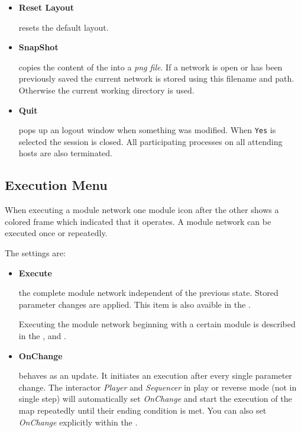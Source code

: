 \begin{itemize}
	 \item {\bf Reset Layout} 

	 resets the default layout.

	 \item {\bf SnapShot} 

	 copies the content of the {\mycanvas} into a {\it png file}. If a network is open or has been previously saved 
    the current network is stored using this filename and path. Otherwise the current working directory is used.
	 
	 \item {\bf Quit}	

	 pops up an logout window  when something was modified.
	 When \verb+Yes+ is selected the {\covise} session is closed. All participating processes on all attending 
    hosts are also terminated.


	 \end{itemize}





	 \subsection{Execution Menu}
    \label{execmenu}

	 When executing a module network one module icon after the other shows a colored frame which
	 indicated that it operates. A module network can be executed once or repeatedly.

	 


	 The settings are:

	 \begin{itemize}
	 \item {\bf Execute} 

	 the complete module network independent of the previous state. Stored parameter changes are applied.
	 This item is also avaible in the {\mytoolbar}.
    
	 Executing the module network beginning with a certain module is described in the 
    {\myactions}, {\myparameter} and {\mycontrol}. 

	 \item {\bf OnChange} 

	 behaves as an update. It initiates
	 an execution after every single parameter change. The  {\mycontrol} interactor {\it Player} and 
    {\it Sequencer} in play or reverse mode (not in single step) will automatically set {\it OnChange}
	 and start the execution of the map repeatedly until their ending condition
	 is met. You can also set {\it OnChange} explicitly within  the {\mycontrol}. 

	 \end{itemize}






